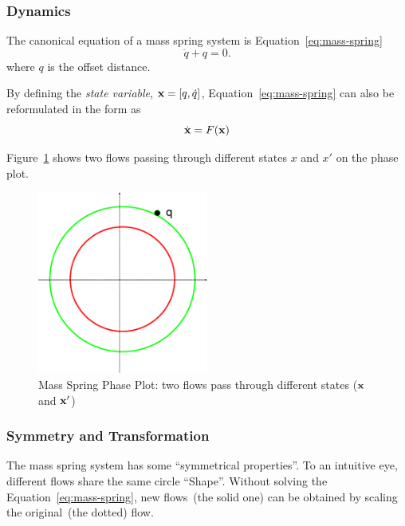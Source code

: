 \subsubsection*{Dynamics}
The canonical equation of a mass spring system is Equation~\ref{eq:mass-spring}
\begin{equation}
\label{eq:mass-spring}
\ddot{q}+q=0.
\end{equation}
where $q$ is the offset distance.

By defining the \emph{state variable}, $\mathbf{x}=[q,\dot{q}]$, Equation~\ref{eq:mass-spring} can also be reformulated in the form as
\[
\dot{\mathbf{x}}=F(\mathbf{x})
\]

Figure~\ref{fig:massSpringPhasePlot} shows two flows passing through different states $x$ and $x'$ on the phase plot.


\begin{figure}[!htbp]
  \begin{center}
     \includegraphics[width=0.5\textwidth]{MassSpringPhasePlot}
    \caption{Mass Spring Phase Plot: two flows pass through different states ($\mathbf{x}$ and ${\mathbf{x}}'$)}
    \label{fig:massSpringPhasePlot}  
  \end{center}
\end{figure}

\subsubsection*{Symmetry and Transformation}

The mass spring system has some ``symmetrical properties''.
To an intuitive eye, different flows share the same circle ``Shape''.
Without solving the Equation~\ref{eq:mass-spring}, new flows~(the solid one) can be obtained by scaling the original~(the dotted) flow.

